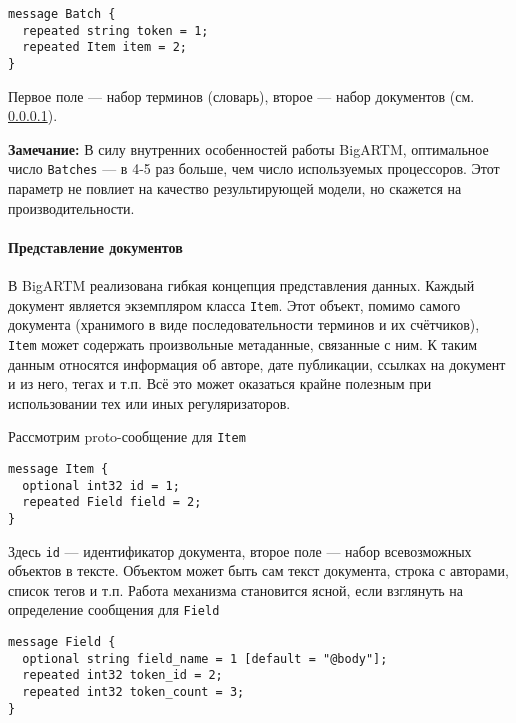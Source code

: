 \vspace{4pt}
\noindent
\verb|message Batch {| \\
\verb|  repeated string token = 1;| \\
\verb|  repeated Item item = 2;| \\
\verb|}|
\vspace{4pt}

Первое поле --- набор терминов (словарь), второе --- набор документов (см. \ref{item_label}).

{\bf Замечание:} В силу внутренних особенностей работы BigARTM, оптимальное число \verb|Batches| --- в 4-5 раз больше, чем число используемых процессоров. Этот параметр не повлиет на качество результирующей модели, но скажется на производительности.

\paragraph{Представление документов}\label{item_label}
 В BigARTM реализована гибкая концепция представления данных. Каждый документ является экземпляром класса \verb'Item'. Этот объект, помимо самого документа (хранимого в виде последовательности терминов и их счётчиков), \verb'Item' может содержать произвольные метаданные, связанные с ним. К таким данным относятся информация об авторе, дате публикации, ссылках на документ и из него, тегах и т.п. Всё это может оказаться крайне полезным при использовании тех или иных регуляризаторов.
 
 Рассмотрим proto-сообщение для \verb|Item|
   
 \vspace{4pt}
 \noindent
 \verb|message Item {| \\
 \verb|  optional int32 id = 1;| \\
 \verb|  repeated Field field = 2;| \\
 \verb|}|
 \vspace{4pt} 
 
 Здесь \verb|id| --- идентификатор документа, второе поле --- набор всевозможных объектов в тексте. Объектом может быть сам текст документа, строка с авторами, список тегов и т.п. Работа механизма становится ясной, если взглянуть на определение сообщения для \verb|Field|
 
 \vspace{4pt}
 \noindent
 \verb|message Field {| \\
 \verb|  optional string field_name = 1 [default = "@body"];| \\
 \verb|  repeated int32 token_id = 2;| \\
 \verb|  repeated int32 token_count = 3;| \\
 \verb|}|
 \vspace{4pt} 
 
